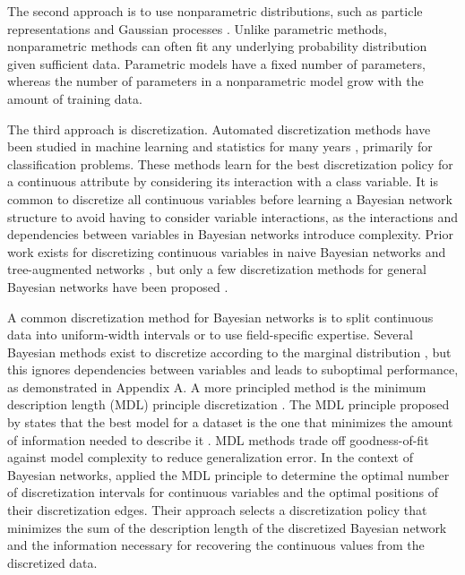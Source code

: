 
The second approach is to use nonparametric distributions, such as particle representations and Gaussian processes \citep{Ickstadt_2010}.
Unlike parametric methods, nonparametric methods can often fit any underlying probability distribution given sufficient data.
Parametric models have a fixed number of parameters, whereas the number of parameters in a nonparametric model grow with the amount of training data.

The third approach is discretization.
Automated discretization methods have been studied in machine learning and statistics for many years \citep{Dougherty_1995, Kerber_1992, Holte_1993, Fayyad_1993}, primarily for classification problems.
These methods learn for the best discretization policy for a continuous attribute by considering its interaction with a class variable.
It is common to discretize all continuous variables before learning a Bayesian network structure to avoid having to consider variable interactions, as the interactions and dependencies between variables in Bayesian networks introduce complexity.
Prior work exists for discretizing continuous variables in naive Bayesian networks and tree-augmented networks \citep{Fried_naive}, but only a few discretization methods for general Bayesian networks have been proposed \citep{Friedman_1996, Kozlov_1997, Monti_1998, Steck_2007}.

A common discretization method for Bayesian networks is to split continuous data into uniform-width intervals or to use field-specific expertise.
Several Bayesian methods exist to discretize according to the marginal distribution \citep{scott1979optimal, freedman1981histogram, knuth2013optimal, scargle2013studies}, but this ignores dependencies between variables and leads to suboptimal performance, as demonstrated in Appendix A.
A more principled method is the minimum description length (MDL) principle discretization \citep{Friedman_1996}.
The MDL principle proposed by \cite{MDL_1978} states that the best model for a dataset is the one that minimizes the amount of information needed to describe it \citep{Grunwald_2009}.
MDL methods trade off goodness-of-fit against model complexity to reduce generalization error.
In the context of Bayesian networks, \cite{Friedman_1996} applied the MDL principle to determine the optimal number of discretization intervals for continuous variables and the optimal positions of their discretization edges.
Their approach selects a discretization policy that minimizes the sum of the description length of the discretized Bayesian network and the information necessary for recovering the continuous values from the discretized data.


